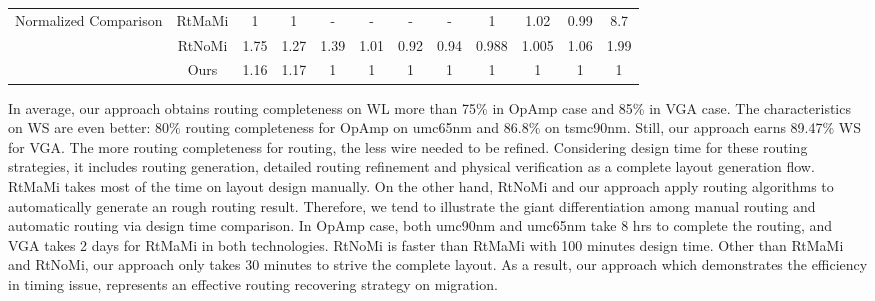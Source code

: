 \begin{table}
\begin{center}
\begin{tabular}{|c|c|c|c|c|c|c|c|c|c|c|c|}
            \hline
              \multirow{3}{1.5cm}{Normalized  Comparison} & 
                RtMaMi    & 1 & 1 &- &- & - & - &  1 & 1.02 &  0.99 & 8.7  \\
                \cline{2-12}
                & RtNoMi  & 1.75  & 1.27 & 1.39 &  1.01 & 0.92 & 0.94 & 0.988 & 1.005 &  1.06 & 1.99   \\
                \cline{2-12}
                & Ours    & {1.16}  & 1.17 & 1    & 1   &  1  & 1 &  1 &  1 & 1 &  1 \\
            \hline

          \end{tabular}
        \end{center}
      \end{table}

      In average, our approach obtains routing completeness on WL more than 75\% in OpAmp case and 85\% in VGA case. The characteristics on WS are even better: 80\% routing completeness for OpAmp on umc65nm and 86.8\% on tsmc90nm. Still, our approach earns 89.47\% WS for VGA. The more routing completeness for routing, the less wire needed to be refined. Considering design time for these routing strategies, it includes routing generation, detailed routing refinement and physical verification as a complete layout generation flow. RtMaMi takes most of the time on layout design manually. On the other hand, RtNoMi and our approach apply routing algorithms to automatically generate an rough routing result. Therefore, we tend to illustrate the giant differentiation among manual routing and automatic routing via design time comparison. In OpAmp case, both umc90nm and umc65nm take 8 hrs to complete the routing, and VGA takes 2 days for RtMaMi in both technologies. RtNoMi is faster than RtMaMi with 100 minutes design time. Other than RtMaMi and RtNoMi, our approach only takes 30 minutes to strive the complete layout. As a result, our approach which demonstrates the efficiency in timing issue, represents an effective routing recovering strategy on migration. 

